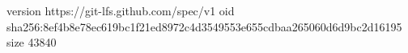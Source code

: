 version https://git-lfs.github.com/spec/v1
oid sha256:8ef4b8e78ec619bc1f21ed8972c4d3549553e655cdbaa265060d6d9bc2d16195
size 43840
